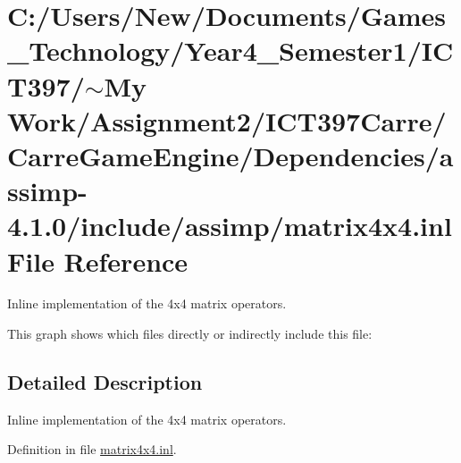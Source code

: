 \hypertarget{matrix4x4_8inl}{
\section{C:/Users/New/Documents/Games\_\-Technology/Year4\_\-Semester1/ICT397/$\sim$My Work/Assignment2/ICT397Carre/CarreGameEngine/Dependencies/assimp-4.1.0/include/assimp/matrix4x4.inl File Reference}
\label{matrix4x4_8inl}
}
Inline implementation of the 4x4 matrix operators. 



This graph shows which files directly or indirectly include this file:

\subsection{Detailed Description}
Inline implementation of the 4x4 matrix operators. 



Definition in file \hyperlink{matrix4x4_8inl-source}{matrix4x4.inl}.